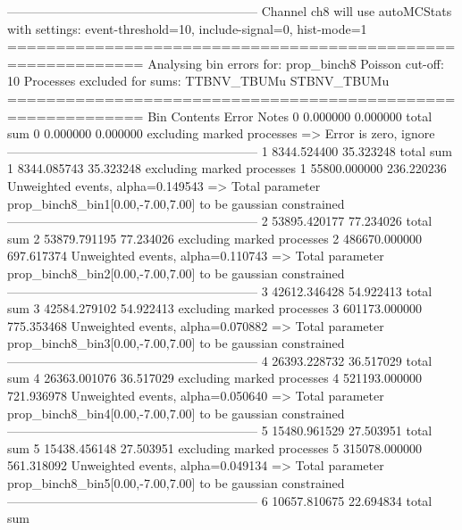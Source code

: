 ------------------------------------------------------------
Channel ch8 will use autoMCStats with settings: event-threshold=10, include-signal=0, hist-mode=1
============================================================
Analysing bin errors for: prop_binch8
Poisson cut-off: 10
Processes excluded for sums: TTBNV_TBUMu STBNV_TBUMu
============================================================
Bin        Contents        Error           Notes                         
0          0.000000        0.000000        total sum                     
0          0.000000        0.000000        excluding marked processes    
  => Error is zero, ignore      
------------------------------------------------------------
1          8344.524400     35.323248       total sum                     
1          8344.085743     35.323248       excluding marked processes    
1          55800.000000    236.220236      Unweighted events, alpha=0.149543
  => Total parameter prop_binch8_bin1[0.00,-7.00,7.00] to be gaussian constrained
------------------------------------------------------------
2          53895.420177    77.234026       total sum                     
2          53879.791195    77.234026       excluding marked processes    
2          486670.000000   697.617374      Unweighted events, alpha=0.110743
  => Total parameter prop_binch8_bin2[0.00,-7.00,7.00] to be gaussian constrained
------------------------------------------------------------
3          42612.346428    54.922413       total sum                     
3          42584.279102    54.922413       excluding marked processes    
3          601173.000000   775.353468      Unweighted events, alpha=0.070882
  => Total parameter prop_binch8_bin3[0.00,-7.00,7.00] to be gaussian constrained
------------------------------------------------------------
4          26393.228732    36.517029       total sum                     
4          26363.001076    36.517029       excluding marked processes    
4          521193.000000   721.936978      Unweighted events, alpha=0.050640
  => Total parameter prop_binch8_bin4[0.00,-7.00,7.00] to be gaussian constrained
------------------------------------------------------------
5          15480.961529    27.503951       total sum                     
5          15438.456148    27.503951       excluding marked processes    
5          315078.000000   561.318092      Unweighted events, alpha=0.049134
  => Total parameter prop_binch8_bin5[0.00,-7.00,7.00] to be gaussian constrained
------------------------------------------------------------
6          10657.810675    22.694834       total sum                     
